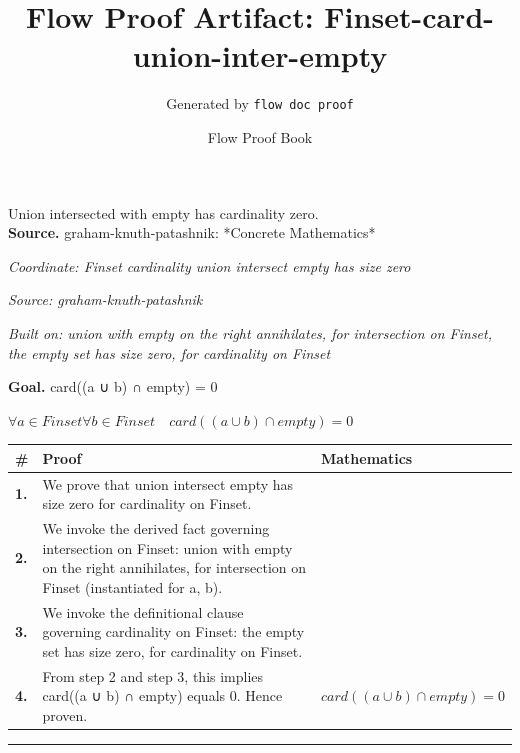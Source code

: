 \documentclass[11pt]{article}
\title{Flow Proof Artifact: Finset-card-union-inter-empty}
\author{Generated by \texttt{flow doc proof}}
\date{Flow Proof Book}
\theoremstyle{definition}
\begin{document}
\maketitle
Union intersected with empty has cardinality zero.\\[0.5em]
\textbf{Source.} graham-knuth-patashnik: *Concrete Mathematics*\\[0.5em]
\bigskip
{}\par
\smallskip\noindent\textit{Coordinate: Finset \cdot cardinality \cdot union intersect empty has size zero}\par
\smallskip\noindent\textit{Source: graham-knuth-patashnik}\par
\smallskip\noindent\textit{Built on: union with empty on the right annihilates, for intersection on Finset, the empty set has size zero, for cardinality on Finset}\par
\medskip
\noindent\textbf{Goal.} card((a ∪ b) ∩ empty) = 0\par
\noindent$\displaystyle \forall a \in Finset \forall b \in Finset\quad card((a ∪ b) ∩ empty) = 0$\par
\medskip
\noindent
\begin{tabular}{@{} >{\raggedright\arraybackslash}p{} >{\raggedright\arraybackslash}p{} >{\raggedleft\arraybackslash}p{} @{}}
\textbf{\#} & \textbf{Proof} & \textbf{Mathematics} \\
\midrule
\textbf{1.} & We prove that union intersect empty has size zero for cardinality on Finset. & \\[0.45em]
\textbf{2.} & We invoke the derived fact governing intersection on Finset: union with empty on the right annihilates, for intersection on Finset (instantiated for a, b). & \\[0.45em]
\textbf{3.} & We invoke the definitional clause governing cardinality on Finset: the empty set has size zero, for cardinality on Finset. & \\[0.45em]
\textbf{4.} & From step 2 and step 3, this implies card((a ∪ b) ∩ empty) equals 0. Hence proven. & $\displaystyle card((a ∪ b) ∩ empty) = 0$ \\[0.45em]
\bottomrule
\end{tabular}
\label{thm:Finset-cardinality-union_intersect_empty_has_size_zero}
\par\medskip\hrule
\end{document}
